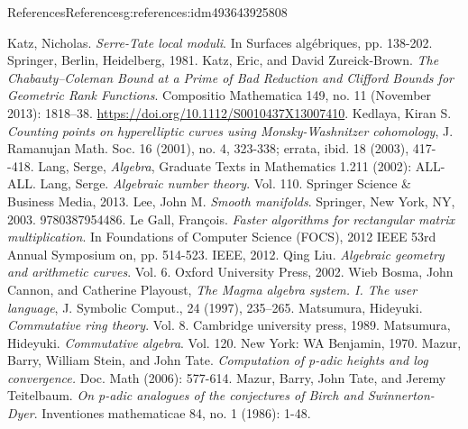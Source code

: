 \documentclass[oneside,10pt,]{book}
\numberwithin{equation}{section}
\begin{document}
\begin{references-chapter-numberless}{References}{}{References}{}{}{g:references:idm493643925808}
\begin{thebibliography}{9}
\hypertarget{x:biblio:bib-katz-serre-tate}{}Katz, Nicholas. \textit{Serre-Tate local moduli}. In Surfaces algébriques, pp. 138-202. Springer, Berlin, Heidelberg, 1981.
\hypertarget{x:biblio:bib-katz-zureick-clifford}{}Katz, Eric, and David Zureick-Brown. \textit{The Chabauty–Coleman Bound at a Prime of Bad Reduction and Clifford Bounds for Geometric Rank Functions}. Compositio Mathematica 149, no. 11 (November 2013): 1818–38. \url{https://doi.org/10.1112/S0010437X13007410}.
\hypertarget{x:biblio:bib-kedlaya-counting}{}Kedlaya, Kiran S. \textit{Counting points on hyperelliptic curves using Monsky-Washnitzer cohomology}, J. Ramanujan Math. Soc. 16 (2001), no. 4, 323-338; errata, ibid. 18 (2003), 417-{}-{}418.
\hypertarget{x:biblio:bib-lang-algebra}{}Lang, Serge,  \textit{Algebra}, Graduate Texts in Mathematics 1.211 (2002): ALL-ALL.
\hypertarget{x:biblio:bib-lang-algebraic-nt}{}Lang, Serge. \textit{Algebraic number theory}. Vol. 110. Springer Science \& Business Media, 2013.
\hypertarget{x:biblio:bib-lee-smooth}{}Lee, John M. \textit{Smooth manifolds}. Springer, New York, NY, 2003. 9780387954486.
\hypertarget{x:biblio:bib-le-gall}{}Le Gall, François. \textit{Faster algorithms for rectangular matrix multiplication}. In Foundations of Computer Science (FOCS), 2012 IEEE 53rd Annual Symposium on, pp. 514-523. IEEE, 2012.
\hypertarget{x:biblio:bib-liu}{}Qing Liu. \textit{Algebraic geometry and arithmetic curves}. Vol. 6. Oxford University Press, 2002.
\hypertarget{x:biblio:bib-magma}{}Wieb Bosma, John Cannon, and Catherine Playoust, \textit{The Magma algebra system. I. The user language}, J. Symbolic Comput., 24 (1997), 235–265.
\hypertarget{x:biblio:bib-matsumura}{}Matsumura, Hideyuki. \textit{Commutative ring theory}. Vol. 8. Cambridge university press, 1989.
\hypertarget{x:biblio:bib-matsumura-algebra}{}Matsumura, Hideyuki. \textit{Commutative algebra}. Vol. 120. New York: WA Benjamin, 1970.
\hypertarget{x:biblio:bib-mazur-stein-tate}{}Mazur, Barry, William Stein, and John Tate. \textit{Computation of p-adic heights and log convergence.} Doc. Math (2006): 577-614.
\hypertarget{x:biblio:bib-mtt}{}Mazur, Barry, John Tate, and Jeremy Teitelbaum. \textit{On p-adic analogues of the conjectures of Birch and Swinnerton-Dyer}. Inventiones mathematicae 84, no. 1 (1986): 1-48.

\end{thebibliography}
\end{references-chapter-numberless}
\end{document}
